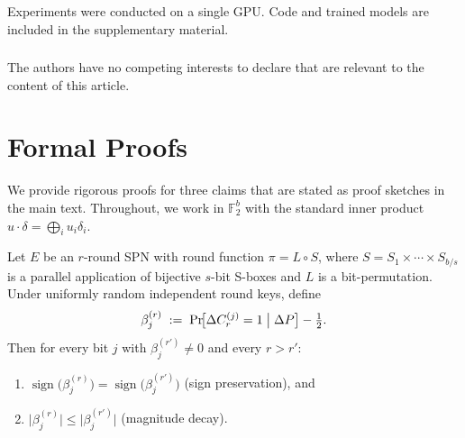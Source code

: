 \documentclass[runningheads]{llncs}
\begin{document}

\begin{credits}
\subsubsection{\ackname}
Experiments were conducted on a single GPU.
Code and trained models are included in the supplementary material.

\subsubsection{\discintname}
The authors have no competing interests to declare that are relevant to the content of this article.
\end{credits}






\appendix

\section{Formal Proofs}
\label{sec:app-proofs}

We provide rigorous proofs for three claims that are stated as proof
sketches in the main text.
Throughout, we work in $\mathbb{F}_2^b$ with the standard inner product
$u \cdot \delta = \bigoplus_i u_i \delta_i$.


\begin{proposition}
\label{prop:c3-spn}
Let $E$ be an $r$-round SPN with round function $\pi = L \circ S$, where
$S = S_1 \times \cdots \times S_{b/s}$ is a parallel application of
bijective $s$-bit S-boxes and $L$ is a bit-permutation.
Under uniformly random independent round keys, define
\[
  \beta_j^{(r)}
  \;:=\;
  \Pr\!\bigl[\Delta C_r^{(j)} = 1 \bigm| \Delta P\bigr]
  - \tfrac{1}{2}.
\]
Then for every bit $j$ with $\beta_j^{(r')} \neq 0$ and every $r > r'$:
\begin{enumerate}[label=\textup{(\alph*)},itemsep=2pt]
  \item $\operatorname{sign}\!\bigl(\beta_j^{(r)}\bigr)
        = \operatorname{sign}\!\bigl(\beta_j^{(r')}\bigr)$
        \quad\textup{(sign preservation)}, and
  \item $\bigl|\beta_j^{(r)}\bigr|
        \leq \bigl|\beta_j^{(r')}\bigr|$
        \quad\textup{(magnitude decay)}.
\end{enumerate}
\end{proposition}
\end{document}
